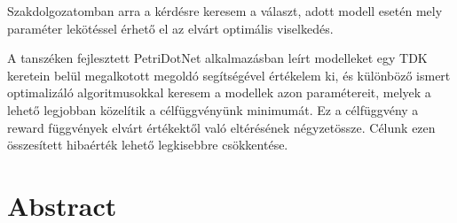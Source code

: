 Szakdolgozatomban arra a kérdésre keresem a választ, adott modell esetén mely paraméter lekötéssel érhető el az elvárt optimális viselkedés. 

A tanszéken fejlesztett PetriDotNet alkalmazásban leírt modelleket egy TDK keretein belül megalkotott megoldó segítségével értékelem ki, és különböző ismert optimalizáló algoritmusokkal keresem a modellek azon paramétereit, melyek a lehető legjobban közelítik a célfüggvényünk minimumát. Ez a célfüggvény a reward függvények elvárt értékektől való eltérésének négyzetössze. Célunk ezen összesített hibaérték lehető legkisebbre csökkentése.


\vfill
\selectenglish


\chapter*{Abstract}



\vfill
\selectthesislanguage

\setcounter{romanPage}{\value{page}}
